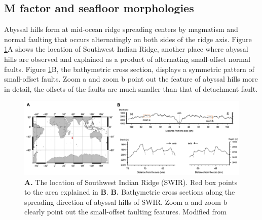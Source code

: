 \documentclass[letterpaper,12pt,notitle]{memphisthesis}                     %
\begin{document}
\subsection{M factor and seafloor morphologies}
Abyssal hills form at mid-ocean ridge spreading centers by magmatism and normal faulting that occurs alternatingly on both sides of the ridge axis. Figure \ref{fig:abyssalhill}A shows the location of Southwest Indian Ridge, another place where abyssal hills are observed and explained as a product of alternating small-offset normal faults. Figure \ref{fig:abyssalhill}B, the bathymetric cross section, displays a symmetric pattern of small-offset faults. Zoom a and zoom b point out the feature of abyssal hills more in detail, the offsets of the faults are much smaller than that of detachment fault.
%
\begin{figure}[!htb]
	\centering
	\includegraphics[width=0.95\linewidth,trim=8 8 8 8,clip]{./figs/abyssalhill.png}
	\caption{\textbf{A.} The location of Southwest Indian Ridge (SWIR). Red box points to the area explained in \textbf{B}. \textbf{B.} Bathymetric cross sections along the spreading direction of abyssal hills of SWIR. Zoom a and zoom b clearly point out the small-offset faulting features. Modified from \citet{Mendel2003}}
	\label{fig:abyssalhill}
\end{figure}
\end{document}
